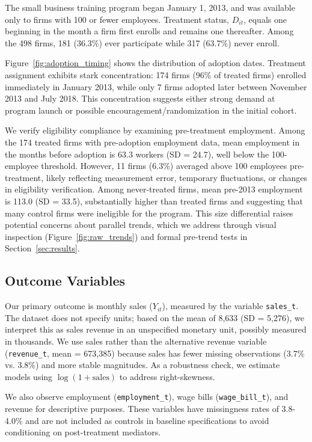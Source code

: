 \documentclass{article}
\begin{document}
The small business training program began January 1, 2013, and was available only to firms with 100 or fewer employees. Treatment status, $D_{it}$, equals one beginning in the month a firm first enrolls and remains one thereafter. Among the 498 firms, 181 (36.3\%) ever participate while 317 (63.7\%) never enroll.

Figure~\ref{fig:adoption_timing} shows the distribution of adoption dates. Treatment assignment exhibits stark concentration: 174 firms (96\% of treated firms) enrolled immediately in January 2013, while only 7 firms adopted later between November 2013 and July 2018. This concentration suggests either strong demand at program launch or possible encouragement/randomization in the initial cohort.

We verify eligibility compliance by examining pre-treatment employment. Among the 174 treated firms with pre-adoption employment data, mean employment in the months before adoption is 63.3 workers (SD = 24.7), well below the 100-employee threshold. However, 11 firms (6.3\%) averaged above 100 employees pre-treatment, likely reflecting measurement error, temporary fluctuations, or changes in eligibility verification. Among never-treated firms, mean pre-2013 employment is 113.0 (SD = 33.5), substantially higher than treated firms and suggesting that many control firms were ineligible for the program. This size differential raises potential concerns about parallel trends, which we address through visual inspection (Figure~\ref{fig:raw_trends}) and formal pre-trend tests in Section~\ref{sec:results}.

\subsection{Outcome Variables}

Our primary outcome is monthly sales ($Y_{it}$), measured by the variable \texttt{sales\_t}. The dataset does not specify units; based on the mean of 8,633 (SD = 5,276), we interpret this as sales revenue in an unspecified monetary unit, possibly measured in thousands. We use sales rather than the alternative revenue variable (\texttt{revenue\_t}, mean = 673,385) because sales has fewer missing observations (3.7\% vs. 3.8\%) and more stable magnitudes. As a robustness check, we estimate models using $\log(1 + \text{sales})$ to address right-skewness.

We also observe employment (\texttt{employment\_t}), wage bills (\texttt{wage\_bill\_t}), and revenue for descriptive purposes. These variables have missingness rates of 3.8-4.0\% and are not included as controls in baseline specifications to avoid conditioning on post-treatment mediators.
\end{document}
